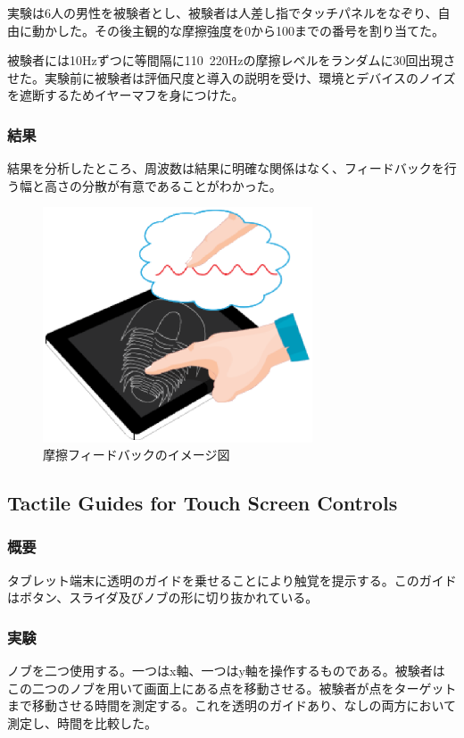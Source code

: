 \documentclass[11pt,a4paper]{jarticle}
\begin{document}
実験は6人の男性を被験者とし、被験者は人差し指でタッチパネルをなぞり、自由に動かした。その後主観的な摩擦強度を0から100までの番号を割り当てた。

被験者には10Hzずつに等間隔に110~220Hzの摩擦レベルをランダムに30回出現させた。実験前に被験者は評価尺度と導入の説明を受け、環境とデバイスのノイズを遮断するためイヤーマフを身につけた。

\subsubsection{結果}
結果を分析したところ、周波数は結果に明確な関係はなく、フィードバックを行う幅と高さの分散が有意であることがわかった。


\begin{figure}[H]
  \begin{center}
  \includegraphics[width=8cm]{fig/figure2.eps}
  \caption{摩擦フィードバックのイメージ図}
  \label{fig:1_test}
  \end{center}
\end{figure}

\subsection{Tactile Guides for Touch Screen Controls\cite{Kincaid:2012:TGT:2377916.2377963}}
\subsubsection{概要}
タブレット端末に透明のガイドを乗せることにより触覚を提示する。このガイドはボタン、スライダ及びノブの形に切り抜かれている。

\subsubsection{実験}
ノブを二つ使用する。一つはx軸、一つはy軸を操作するものである。被験者はこの二つのノブを用いて画面上にある点を移動させる。被験者が点をターゲットまで移動させる時間を測定する。これを透明のガイドあり、なしの両方において測定し、時間を比較した。
\end{document}
